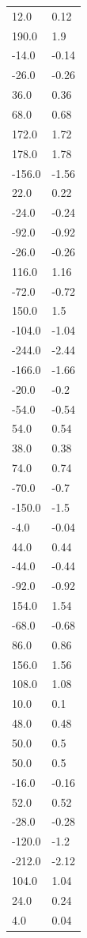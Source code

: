 \begin{longtable}{ll}
12.0 & 0.12 \\
190.0 & 1.9 \\
-14.0 & -0.14 \\
-26.0 & -0.26 \\
36.0 & 0.36 \\
68.0 & 0.68 \\
172.0 & 1.72 \\
178.0 & 1.78 \\
-156.0 & -1.56 \\
22.0 & 0.22 \\
-24.0 & -0.24 \\
-92.0 & -0.92 \\
-26.0 & -0.26 \\
116.0 & 1.16 \\
-72.0 & -0.72 \\
150.0 & 1.5 \\
-104.0 & -1.04 \\
-244.0 & -2.44 \\
-166.0 & -1.66 \\
-20.0 & -0.2 \\
-54.0 & -0.54 \\
54.0 & 0.54 \\
38.0 & 0.38 \\
74.0 & 0.74 \\
-70.0 & -0.7 \\
-150.0 & -1.5 \\
-4.0 & -0.04 \\
44.0 & 0.44 \\
-44.0 & -0.44 \\
-92.0 & -0.92 \\
154.0 & 1.54 \\
-68.0 & -0.68 \\
86.0 & 0.86 \\
156.0 & 1.56 \\
108.0 & 1.08 \\
10.0 & 0.1 \\
48.0 & 0.48 \\
50.0 & 0.5 \\
50.0 & 0.5 \\
-16.0 & -0.16 \\
52.0 & 0.52 \\
-28.0 & -0.28 \\
-120.0 & -1.2 \\
-212.0 & -2.12 \\
104.0 & 1.04 \\
24.0 & 0.24 \\
4.0 & 0.04 \\

\end{longtable}
